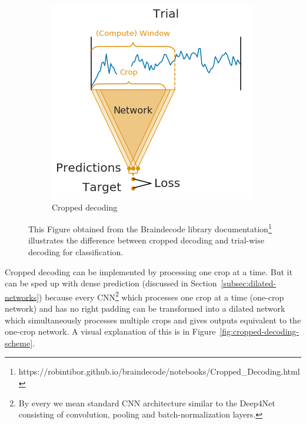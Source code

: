 \begin{figure}[!htbp]
\begin{subfigure}[b]{0.45\textwidth}
   \includegraphics[width=\linewidth]{img/ch3/trialwise-explanation2}
   \caption{Cropped decoding}
   \label{fig:trial-wise-decoding-cropped}
\end{subfigure}
\caption[Trial-wise vs. cropped decoding]{This Figure obtained from the Braindecode library documentation\footnote{https://robintibor.github.io/braindecode/notebooks/Cropped\_Decoding.html} illustrates the difference between cropped decoding and trial-wise decoding for classification.}
\label{fig:trial-wise-decoding} 
\end{figure}

Cropped decoding can be implemented by processing one crop at a time.
But it can be sped up with dense prediction (discussed in Section~\ref{subsec:dilated-networks}) because every CNN\footnote{By every we mean standard CNN architecture similar to the Deep4Net consisting of convolution, pooling and batch-normalization layers.} which processes one crop at a time (one-crop network) and has no right padding can be transformed into a dilated network which simultaneously processes multiple crops and gives outputs equivalent to the one-crop network. 
A visual explanation of this is in Figure~\ref{fig:cropped-decoding-scheme}.


